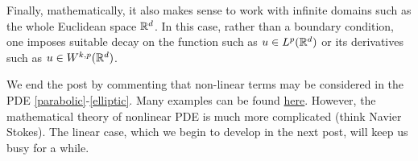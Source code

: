 \documentclass[
	a4paper,
	DIV=14,
	abstract=true,
	numbers=noenddot
]
{scrartcl}
\theoremstyle{definition}
\begin{document}
Finally, mathematically, it also makes sense to work with infinite domains such as the whole Euclidean space $\mathbb{R}^d$. In this case, rather than a boundary condition, one imposes suitable decay on the function such as $u \in L^p(\mathbb{R}^d)$ or its derivatives such as $u \in W^{k,p}(\mathbb{R}^d)$.


We end the post by commenting that non-linear terms may be considered in the PDE \eqref{parabolic}-\eqref{elliptic}. Many examples can be found \href{https://en.wikipedia.org/wiki/List_of_nonlinear_partial_differential_equations}{here}. However, the mathematical theory of nonlinear PDE is much more complicated (think Navier Stokes). The linear case, which we begin to develop in the next post, will keep us busy for a while.












\end{document}

